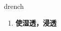
\begin{frame}
{\huge drench}
\begin{center}
\begin{enumerate}\Large
  \item \textbf{使湿透，浸透}
\end{enumerate}
\end{center}
\end{frame}
